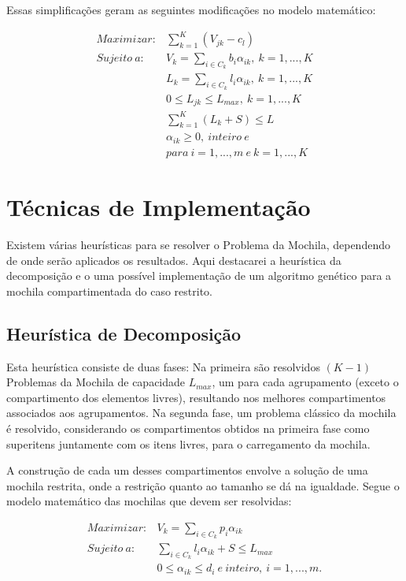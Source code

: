 Essas simplificações geram as seguintes modificações no modelo matemático:

\begin{eqnarray}
	Maximizar: & \displaystyle \sum_{k = 1}^{K}(V_{jk} - c_{l}) \\
	Sujeito \ a: &  \displaystyle V_{k} = \sum_{i \in C_{k}}b_{i}\alpha_{ik}, \ k = 1, ..., K \\
	& \displaystyle L_{k} = \sum_{i \in C_{k}}l_{i}\alpha_{ik}, \ k = 1, ..., K \\
	& \displaystyle 0 \leq L_{jk} \leq L_{max}, \ k = 1, ..., K \\
	& \displaystyle \sum_{k = 1}^{K}(L_{k} + S) \leq L \\
	& \displaystyle \alpha_{ik} \geq 0, \ inteiro \ e \nonumber\\
	& \displaystyle para \ i = 1, ..., m \ e \ k = 1, ..., K \nonumber
\end{eqnarray}

\section{Técnicas de Implementação}

Existem várias heurísticas para se resolver o Problema da Mochila, dependendo de onde serão aplicados os resultados. Aqui destacarei a heurística da decomposição e o uma possível implementação de um algoritmo genético para a mochila compartimentada do caso restrito.

\subsection{Heurística de Decomposição}

Esta heurística consiste de duas fases: Na primeira são resolvidos $(K-1)$ Problemas da Mochila de capacidade $L_{max}$, um para cada agrupamento (exceto o compartimento dos elementos livres), resultando nos melhores compartimentos associados aos agrupamentos. Na segunda fase, um problema clássico da mochila é resolvido, considerando os compartimentos obtidos na primeira fase como superitens juntamente com os itens livres, para o carregamento da mochila.

A construção de cada um desses compartimentos envolve a solução de uma mochila restrita, onde a restrição quanto ao tamanho se dá na igualdade. Segue o modelo matemático das mochilas que devem ser resolvidas:

\begin{eqnarray}
	Maximizar: & \displaystyle V_{k} = \sum_{i \in C_{k}}p_{i}\alpha_{ik} \\
	Sujeito \ a: & \displaystyle \sum_{i \in C_{k}}l_{i}\alpha_{ik} + S \leq L_{max} \\
	& \displaystyle 0 \leq \alpha_{ik} \leq d_{i} \ e \ inteiro, \ i = 1, ..., m. \nonumber
\end{eqnarray}

